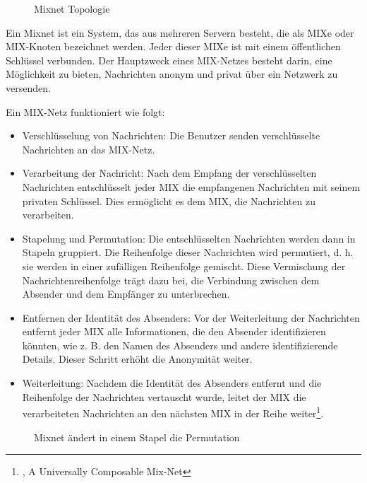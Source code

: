 \begin{figure}[h!]
    \centering
    
    \caption{Mixnet Topologie}
    \label{imgs:mixnet}
\end{figure}

Ein Mixnet ist ein System, das aus mehreren Servern besteht, die als MIXe oder MIX-Knoten bezeichnet werden. Jeder dieser MIXe ist mit einem öffentlichen Schlüssel verbunden. Der Hauptzweck eines MIX-Netzes besteht darin, eine Möglichkeit zu bieten, Nachrichten anonym und privat über ein Netzwerk zu versenden.

Ein MIX-Netz funktioniert wie folgt:

\begin{itemize}
    \item Verschlüsselung von Nachrichten: Die Benutzer senden verschlüsselte Nachrichten an das MIX-Netz.
    \item Verarbeitung der Nachricht: Nach dem Empfang der verschlüsselten Nachrichten entschlüsselt jeder MIX die empfangenen Nachrichten mit seinem privaten Schlüssel. Dies ermöglicht es dem MIX, die Nachrichten zu verarbeiten.
    \item Stapelung und Permutation: Die entschlüsselten Nachrichten werden dann in Stapeln gruppiert. Die Reihenfolge dieser Nachrichten wird permutiert, d. h. sie werden in einer zufälligen Reihenfolge gemischt. Diese Vermischung der Nachrichtenreihenfolge trägt dazu bei, die Verbindung zwischen dem Absender und dem Empfänger zu unterbrechen.
    \item Entfernen der Identität des Absenders: Vor der Weiterleitung der Nachrichten entfernt jeder MIX alle Informationen, die den Absender identifizieren könnten, wie z. B. den Namen des Absenders und andere identifizierende Details. Dieser Schritt erhöht die Anonymität weiter.
    \item Weiterleitung: Nachdem die Identität des Absenders entfernt und die Reihenfolge der Nachrichten vertauscht wurde, leitet der MIX die verarbeiteten Nachrichten an den nächsten MIX in der Reihe weiter\footnote{\cite{ComposableMixNet}, A Universally Composable Mix-Net}.
\end{itemize}

\begin{figure}[h!]
    \centering
    
    \caption{Mixnet ändert in einem Stapel die Permutation}
    \label{imgs:mixnet_stack}
\end{figure}

